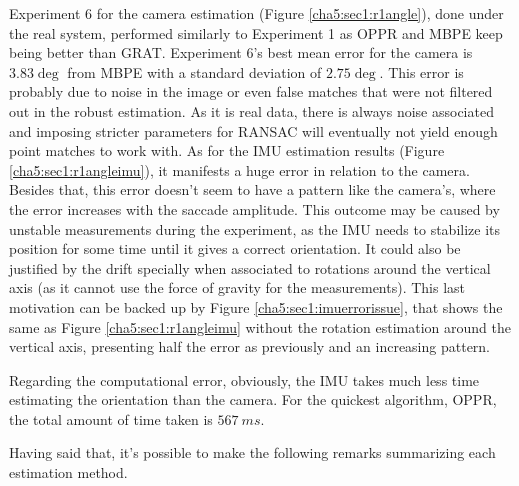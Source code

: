 Experiment 6 for the camera estimation (Figure \ref{cha5:sec1:r1angle}), done under the real system, performed similarly to Experiment 1 as OPPR and MBPE keep being better than GRAT. Experiment 6's best mean error for the camera is $3.83 \deg $ from MBPE with a standard deviation of $2.75 \deg$. This error is probably due to noise in the image or even false matches that were not filtered out in the robust estimation. As it is real data, there is always noise associated and imposing stricter parameters  for RANSAC will eventually not yield enough point matches to work with. 
As for the IMU estimation results (Figure \ref{cha5:sec1:r1angleimu}), it manifests a huge error in relation to the camera. Besides that, this error doesn't seem to have a pattern like the camera's, where the error increases with the saccade amplitude. This outcome may be caused by unstable measurements during the experiment, as the IMU needs to stabilize its position for some time until it gives a correct orientation. It could also be justified by the drift specially when associated to rotations around the vertical axis (as it cannot use the force of gravity for the measurements). This last motivation can be backed up by Figure \ref{cha5:sec1:imuerrorissue}, that shows the same as Figure \ref{cha5:sec1:r1angleimu} without the rotation estimation around the vertical axis, presenting half the error as previously and an increasing pattern.

Regarding the computational error, obviously, the IMU takes much less time estimating the orientation than the camera. For the quickest algorithm, OPPR, the total amount of time taken is $567 \ ms$. 

Having said that, it's possible to make the following remarks summarizing each estimation method.


